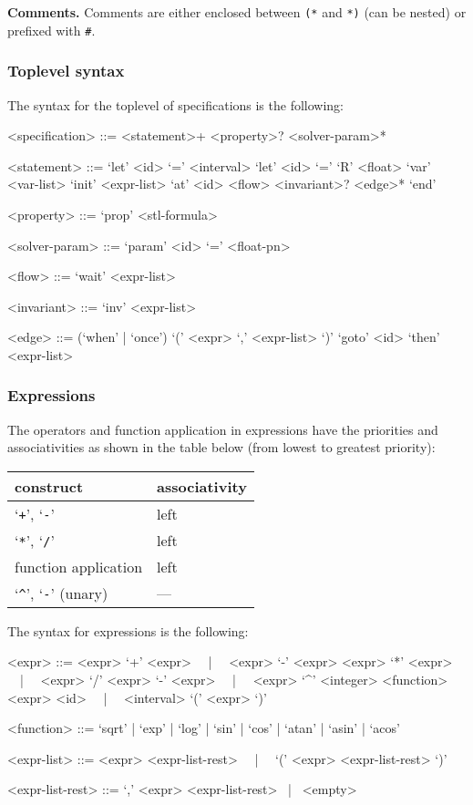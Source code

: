 \documentclass[10pt,a4paper]{article}
\begin{document}
\noindent
\textbf{Comments.}
Comments are either enclosed between \texttt{(*} and \texttt{*)} (can be nested) or prefixed with \texttt{\#}.


\subsubsection{Toplevel syntax}

The syntax for the toplevel of specifications is the following:
\begin{grammar}
<specification> ::= <statement>+ <property>? <solver-param>*

<statement> ::= 
`let' <id> `=' <interval>
\alt `let' <id> `=' `R' <float>
\alt `var' <var-list>
\alt `init' <expr-list>
\alt `at' <id> <flow> <invariant>? <edge>* `end'

<property> ::= `prop' <stl-formula>

<solver-param> ::= `param' <id> `=' <float-pn>


<flow> ::= `wait' <expr-list>

<invariant> ::= `inv' <expr-list>

<edge> ::= (`when' | `once') `(' <expr> `,' <expr-list> `)' `goto' <id> `then' <expr-list>
\end{grammar}


\subsubsection{Expressions}

The operators and function application in expressions have the priorities and associativities as shown in the table below (from lowest to greatest priority):
\begin{table}[ht]
	\centering
    \begin{tabular}{|l|l|} \hline
		construct & associativity \\
		\hline
		`\texttt{+}', `\texttt{-}' & left \\
		`\texttt{*}', `\texttt{/}' & left \\
		function application & left \\
		`\texttt{\^}', `\texttt{-}' (unary) & --- \\
		\hline
	\end{tabular}
\end{table}

The syntax for expressions is the following:
\begin{grammar}
<expr> ::= <expr> `+' <expr> ~~|~~ <expr> `-' <expr>
\alt <expr> `*' <expr> ~~|~~ <expr> `/' <expr>
\alt `-' <expr> ~~|~~ <expr> `^' <integer>
\alt <function> <expr>
\alt <id> ~~|~~ <interval>
\alt `(' <expr> `)' 

<function> ::= `sqrt' | `exp' | `log' | `sin' | `cos' | `atan' | `asin' | `acos'

<expr-list> ::= <expr> <expr-list-rest> ~~|~~ `(' <expr> <expr-list-rest> `)'

<expr-list-rest> ::= `,' <expr> <expr-list-rest> ~|~ <empty>
\end{grammar}
\end{document}
